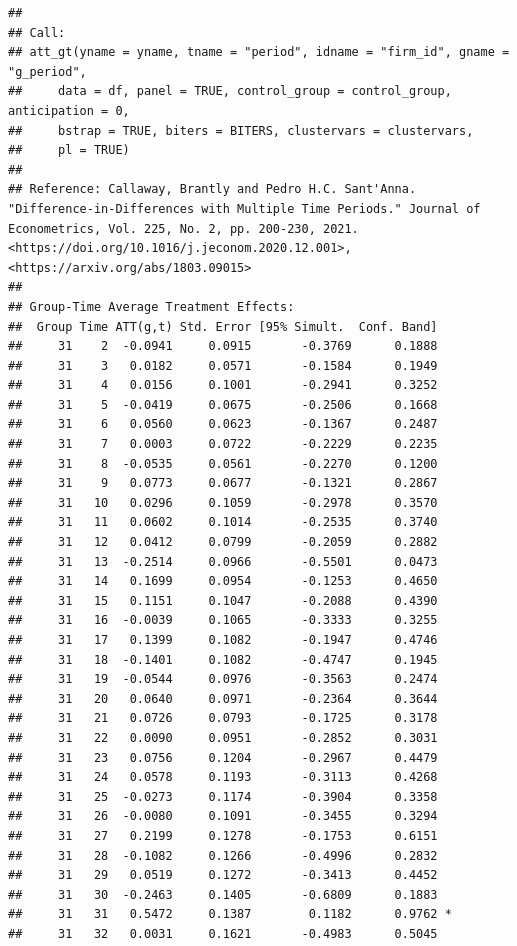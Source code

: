 \documentclass[
]{article}
\begin{document}
\begin{verbatim}
## 
## Call:
## att_gt(yname = yname, tname = "period", idname = "firm_id", gname = "g_period", 
##     data = df, panel = TRUE, control_group = control_group, anticipation = 0, 
##     bstrap = TRUE, biters = BITERS, clustervars = clustervars, 
##     pl = TRUE)
## 
## Reference: Callaway, Brantly and Pedro H.C. Sant'Anna.  "Difference-in-Differences with Multiple Time Periods." Journal of Econometrics, Vol. 225, No. 2, pp. 200-230, 2021. <https://doi.org/10.1016/j.jeconom.2020.12.001>, <https://arxiv.org/abs/1803.09015> 
## 
## Group-Time Average Treatment Effects:
##  Group Time ATT(g,t) Std. Error [95% Simult.  Conf. Band]  
##     31    2  -0.0941     0.0915       -0.3769      0.1888  
##     31    3   0.0182     0.0571       -0.1584      0.1949  
##     31    4   0.0156     0.1001       -0.2941      0.3252  
##     31    5  -0.0419     0.0675       -0.2506      0.1668  
##     31    6   0.0560     0.0623       -0.1367      0.2487  
##     31    7   0.0003     0.0722       -0.2229      0.2235  
##     31    8  -0.0535     0.0561       -0.2270      0.1200  
##     31    9   0.0773     0.0677       -0.1321      0.2867  
##     31   10   0.0296     0.1059       -0.2978      0.3570  
##     31   11   0.0602     0.1014       -0.2535      0.3740  
##     31   12   0.0412     0.0799       -0.2059      0.2882  
##     31   13  -0.2514     0.0966       -0.5501      0.0473  
##     31   14   0.1699     0.0954       -0.1253      0.4650  
##     31   15   0.1151     0.1047       -0.2088      0.4390  
##     31   16  -0.0039     0.1065       -0.3333      0.3255  
##     31   17   0.1399     0.1082       -0.1947      0.4746  
##     31   18  -0.1401     0.1082       -0.4747      0.1945  
##     31   19  -0.0544     0.0976       -0.3563      0.2474  
##     31   20   0.0640     0.0971       -0.2364      0.3644  
##     31   21   0.0726     0.0793       -0.1725      0.3178  
##     31   22   0.0090     0.0951       -0.2852      0.3031  
##     31   23   0.0756     0.1204       -0.2967      0.4479  
##     31   24   0.0578     0.1193       -0.3113      0.4268  
##     31   25  -0.0273     0.1174       -0.3904      0.3358  
##     31   26  -0.0080     0.1091       -0.3455      0.3294  
##     31   27   0.2199     0.1278       -0.1753      0.6151  
##     31   28  -0.1082     0.1266       -0.4996      0.2832  
##     31   29   0.0519     0.1272       -0.3413      0.4452  
##     31   30  -0.2463     0.1405       -0.6809      0.1883  
##     31   31   0.5472     0.1387        0.1182      0.9762 *
##     31   32   0.0031     0.1621       -0.4983      0.5045  

\end{verbatim}
\end{document}
